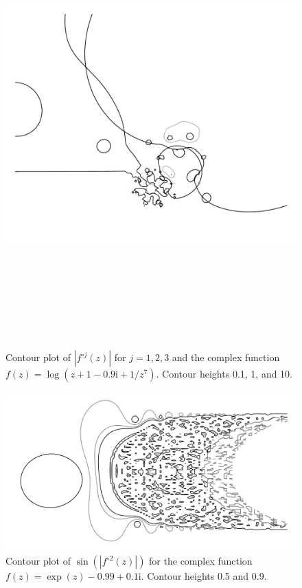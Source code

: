 \documentclass[12pt, a4paper]{amsart}
\newcommand{\mi}{\text{i}}  %
\begin{document}
\begin{figure}[!ht]
\includegraphics[width=160mm, height=170mm]{images/three_monkeys_eaten.pdf}
\caption{
Contour plot of $|f^{\circ j}(z)|$ for $j = 1, 2, 3$ and the complex function $f(z) = \log(z + 1 -0.9\mi + 1/z^7)$.
Contour heights 0.1, 1, and 10.
}
\end{figure}
\pagebreak
\begin{figure}[!ht] 
\includegraphics[width=230mm, angle=-90]{images/mr_fancy_pants.pdf}
\caption{
Contour plot of $\sin(|f^{\circ 2}(z)|)$ for the complex function $f(z) = \exp(z) - 0.99 + 0.1\mi$.
Contour heights 0.5 and 0.9.
}
\end{figure}
\end{document}
